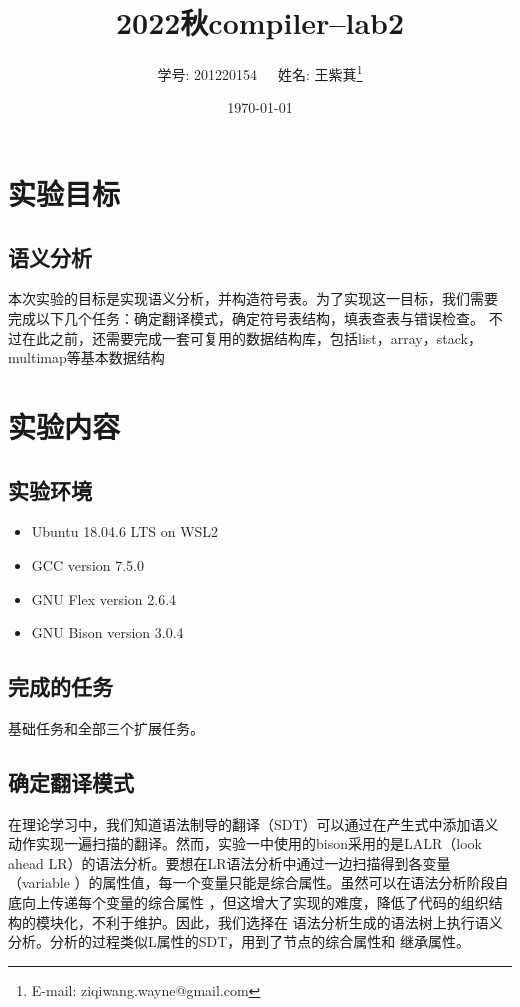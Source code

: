 \documentclass[twocolumn]{article}
\title{2022秋compiler--lab2}
\author{学号: 201220154\ \ \ 姓名: 王紫萁\thanks{E-mail: ziqiwang.wayne@gmail.com}}
\date{\today}
\affil{Department of Computer Science, Nanjing University}
\begin{document}
\maketitle
\section{实验目标}
\subsection{语义分析}
本次实验的目标是实现语义分析，并构造符号表。为了实现这一目标，我们需要
完成以下几个任务：确定翻译模式，确定符号表结构，填表查表与错误检查。
不过在此之前，还需要完成一套可复用的数据结构库，包括list，array，stack，multimap等基本数据结构
\section{实验内容}
\subsection{实验环境}
\begin{itemize}
    \item Ubuntu 18.04.6 LTS on WSL2
    \item GCC version 7.5.0
    \item GNU Flex version 2.6.4
    \item GNU Bison version 3.0.4
\end{itemize}
\subsection{完成的任务}
基础任务和全部三个扩展任务。
\subsection{确定翻译模式}
在理论学习中，我们知道语法制导的翻译（SDT）可以通过在产生式中添加语义
动作实现一遍扫描的翻译。然而，实验一中使用的bison采用的是LALR（look
ahead LR）的语法分析。要想在LR语法分析中通过一边扫描得到各变量（variable
）的属性值，每一个变量只能是综合属性。虽然可以在语法分析阶段自底向上传递每个变量的综合属性
，但这增大了实现的难度，降低了代码的组织结构的模块化，不利于维护。因此，我们选择在
语法分析生成的语法树上执行语义分析。分析的过程类似L属性的SDT，用到了节点的综合属性和
继承属性。
\end{document}
